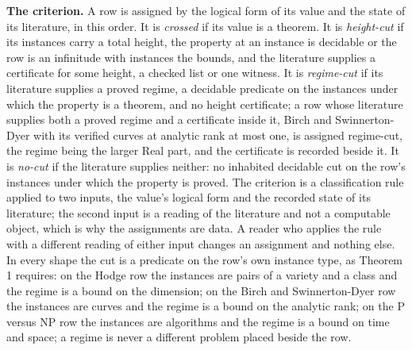 \documentclass[10pt,twocolumn]{article}
\begin{document}
\textbf{The criterion.} A row is assigned by the logical form of its
value and the state of its literature, in this order. It is
\emph{crossed} if its value is a theorem. It is \emph{height-cut} if its
instances carry a total height, the property at an instance is decidable
or the row is an infinitude with instances the bounds, and the
literature supplies a certificate for some height, a checked list or one
witness. It is \emph{regime-cut} if its literature supplies a proved
regime, a decidable predicate on the instances under which the property
is a theorem, and no height certificate; a row whose literature supplies
both a proved regime and a certificate inside it, Birch and
Swinnerton-Dyer with its verified curves at analytic rank at most one,
is assigned regime-cut, the regime being the larger Real part, and the
certificate is recorded beside it. It is \emph{no-cut} if the literature
supplies neither: no inhabited decidable cut on the row's instances
under which the property is proved. The criterion is a classification
rule applied to two inputs, the value's logical form and the recorded
state of its literature; the second input is a reading of the literature
and not a computable object, which is why the assignments are data. A
reader who applies the rule with a different reading of either input
changes an assignment and nothing else. In every shape the cut is a
predicate on the row's own instance type, as Theorem 1 requires: on the
Hodge row the instances are pairs of a variety and a class and the
regime is a bound on the dimension; on the Birch and Swinnerton-Dyer row
the instances are curves and the regime is a bound on the analytic rank;
on the P versus NP row the instances are algorithms and the regime is a
bound on time and space; a regime is never a different problem placed
beside the row.
\end{document}

